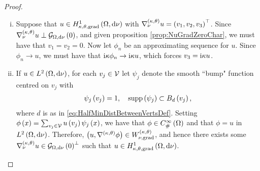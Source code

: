 \begin{proof}
	\begin{enumerate}[(i)]
		\item Suppose that $u\in H^1_{\kappa,\theta,\mathrm{grad}}\left( \Omega, \mathrm{d}\nu \right)$ with $\nabla^{\left( \kappa, \theta \right)}_{\nu}u = \left( v_1,v_2,v_3 \right)^\top$.
		Since $\nabla^{\left( \kappa, \theta \right)}_{\nu}u\perp\mathcal{G}_{ \Omega, \mathrm{d}\nu}\left( 0 \right)$, and given proposition \ref{prop:NuGradZeroChar}, we must have that $v_1 = v_2 = 0$.
		Now let $\phi_n$ be an approximating sequence for $u$.
		Since $\phi_n\rightarrow u$, we must have that $\mathrm{i}\kappa\phi_n\rightarrow\mathrm{i}\kappa u$, which forces $v_3 = \mathrm{i}\kappa u$.
		\item If $u\in L^{2}\left( \Omega,\mathrm{d} \nu \right)$, for each $v_j\in\mathcal{V}$ let $\psi_j$ denote the smooth ``bump" function centred on $v_j$ with
		\begin{align*}
			\psi_j\left( v_j \right) = 1, \quad \mathrm{supp}\left( \psi_j \right)\subset B_d\left( v_j \right),
		\end{align*}
		where $d$ is as in \eqref{eq:HalfMinDistBetweenVertsDef}.
		Setting $\phi\left( x \right) = \sum_{v_j\in\mathcal{V}}u\left( v_j \right)\psi_j\left( x \right)$, we have that $\phi\in C^{\infty}_{\#}\left( \Omega \right)$ and that $\phi = u$ in $L^{2}\left( \Omega,\mathrm{d} \nu \right)$.
		Therefore, $\left( u, \nabla^{\left( \kappa, \theta \right)}\phi \right)\in W^{\left( \kappa, \theta \right)}_{\nu,\mathrm{grad}}$, and hence there exists some $\nabla^{\left( \kappa, \theta \right)}_\nu u\in\mathcal{G}_{ \Omega, \mathrm{d}\nu}\left( 0 \right)^\perp$ such that $u\in H^1_{\kappa,\theta,\mathrm{grad}}\left( \Omega, \mathrm{d}\nu \right)$.
	\end{enumerate}
\end{proof}

